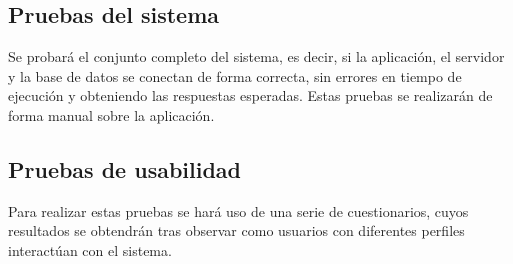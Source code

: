 \subsection{Pruebas del sistema}
Se probará el conjunto completo del sistema, es decir, si la aplicación, el servidor y la base de datos se conectan de forma correcta, sin errores en tiempo de ejecución y obteniendo las respuestas esperadas. Estas pruebas se realizarán de forma manual sobre la aplicación.
\subsection{Pruebas de usabilidad}
Para realizar estas pruebas se hará uso de una serie de cuestionarios, cuyos resultados se obtendrán tras observar como usuarios con diferentes perfiles interactúan con el sistema.


